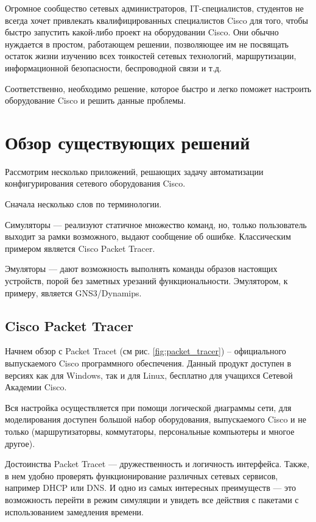 \documentclass[a4paper,14pt]{extreport}
\begin{document}
	Огромное сообщество сетевых администраторов, IT-специалистов, студентов не всегда хочет привлекать квалифицированных специалистов
	Cisco для того, чтобы быстро запустить какой-либо проект на оборудовании Cisco. Они обычно нуждается в простом, работающем решении,
	позволяющее им не посвящать остаток жизни изучению всех тонкостей сетевых технологий, маршрутизации, информационной безопасности, беспроводной связи и т.д.
	
	Соответственно, необходимо решение, которое быстро и легко поможет настроить оборудование Cisco и решить данные проблемы.
	
	\chapter{Обзор существующих решений}
	
	Рассмотрим несколько приложений, решающих задачу автоматизации
	конфигурирования сетевого оборудования Cisco.
	
	Сначала несколько слов по терминологии.
	
	Симуляторы — реализуют статичное множество команд, но, только
	пользователь выходит за рамки возможного, выдают сообщение об ошибке. Классическим примером является Cisco Packet Tracer.
	
	Эмуляторы — дают возможность выполнять команды образов настоящих устройств, порой без заметных урезаний функциональности. Эмулятором, к примеру, является GNS3/Dynamips.
	
	\section{Cisco Packet Tracer}
	
	
	Начнем обзор с Packet Tracet (см рис. \ref{fig:packet_tracer}) – официального выпускаемого Cisco
	программного обеспечения. Данный продукт доступен в версиях как для
	Windows, так и для Linux, бесплатно для учащихся Сетевой Академии
	Cisco.
	
	Вся настройка осуществляется при помощи логической диаграммы сети, для моделирования доступен большой набор оборудования, выпускаемого Cisco и не только (маршрутизаторвы, коммутаторы, персональные компьютеры и многое другое).
	
	Достоинства Packet Tracet — дружественность и логичность интерфейса. Также, в нем удобно проверять функционирование различных сетевых сервисов, например DHCP или DNS. И одно из самых интересных преимуществ — это
	возможность перейти в режим симуляции и увидеть все действия с
	пакетами с использованием замедления времени.
	
\end{document}
